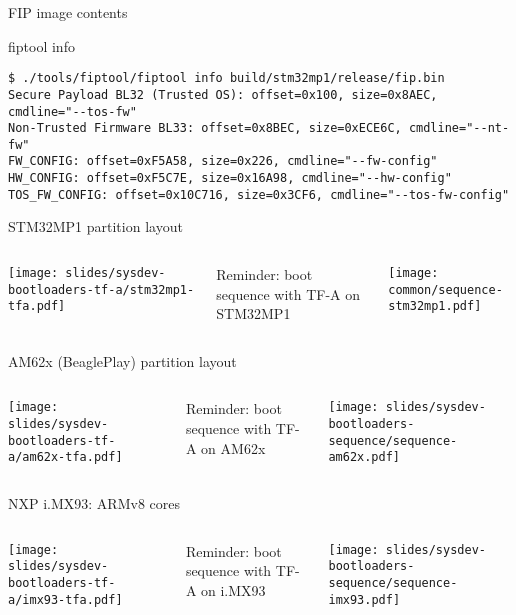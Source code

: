 \begin{frame}[fragile]{FIP image contents}
  \begin{block}{fiptool info}
    {\footnotesize
\begin{verbatim}
$ ./tools/fiptool/fiptool info build/stm32mp1/release/fip.bin
Secure Payload BL32 (Trusted OS): offset=0x100, size=0x8AEC, cmdline="--tos-fw"
Non-Trusted Firmware BL33: offset=0x8BEC, size=0xECE6C, cmdline="--nt-fw"
FW_CONFIG: offset=0xF5A58, size=0x226, cmdline="--fw-config"
HW_CONFIG: offset=0xF5C7E, size=0x16A98, cmdline="--hw-config"
TOS_FW_CONFIG: offset=0x10C716, size=0x3CF6, cmdline="--tos-fw-config"
\end{verbatim}
    }
  \end{block}
\end{frame}

\begin{frame}{STM32MP1 partition layout}
  \begin{columns}
  \begin{center}
    \texttt{[image: slides/sysdev-bootloaders-tf-a/stm32mp1-tfa.pdf]}
  \end{center}
  \small Reminder: boot sequence with TF-A on STM32MP1
  \begin{center}
    \texttt{[image: common/sequence-stm32mp1.pdf]}
  \end{center}
  \end{columns}
\end{frame}

\begin{frame}{AM62x (BeaglePlay) partition layout}
  \begin{columns}
  \begin{center}
    \texttt{[image: slides/sysdev-bootloaders-tf-a/am62x-tfa.pdf]}
  \end{center}
  \small Reminder: boot sequence with TF-A on AM62x
  \begin{center}
    \texttt{[image: slides/sysdev-bootloaders-sequence/sequence-am62x.pdf]}
  \end{center}
  \end{columns}
\end{frame}

\begin{frame}{NXP i.MX93: ARMv8 cores}
  \begin{columns}
  \begin{center}
    \texttt{[image: slides/sysdev-bootloaders-tf-a/imx93-tfa.pdf]}
  \end{center}
  \small Reminder: boot sequence with TF-A on i.MX93
  \begin{center}
    \texttt{[image: slides/sysdev-bootloaders-sequence/sequence-imx93.pdf]}
  \end{center}
  \end{columns}
\end{frame}
